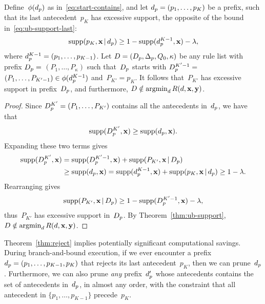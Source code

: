\begin{arxiv}
\begin{proposition}
\label{prop:ub-support}
Define~$\phi(d_p)$ as in~\eqref{eq:start-contains},
and let ${d_p = (p_1, \dots, p_{K})}$ be a prefix,
such that its last antecedent~$p_{K}$ has excessive support,
\ie the opposite of the bound in~\eqref{eq:ub-support-last}:
\begin{align}
\textnormal{supp}(p_K, \mathbf{x} \,|\, d_p) \ge 1 - \textnormal{supp}(d_p^{K-1}, \mathbf{x}) - {\lambda},
\end{align}
where ${d_p^{K-1} = (p_1, \dots, p_{K-1})}$.
%
Let ${{D} = (D_p, \Delta_p, Q_0, \kappa)}$
be any rule list with prefix
${D_p =}$ ${(P_1, \dots, P_{\kappa})}$
such that~$D_p$ starts with ${D_p^{K'-1} =}$
${(P_1, \dots, P_{K'-1}) \in \phi(d_p^{K-1})}$
and~${P_{K'} = p_{K}}$.
%
It follows that~$P_{K'}$ has excessive support in prefix~$D_p$,
and furthermore, ${{D} \notin \operatorname*{argmin}_{{d}} R({d}, \mathbf{x}, \mathbf{y})}$.
\end{proposition}

\begin{proof}
Since ${D_p^{K'} = (P_1, \dots, P_{K'})}$
contains all the antecedents in~$d_p$, we have that
\begin{align}
\textnormal{supp}(D_p^{K'}, \mathbf{x}) \ge \textnormal{supp}(d_p, \mathbf{x}).
\end{align}
Expanding these two terms gives
\begin{align}
\textnormal{supp}(D_p^{K'}, \mathbf{x})
&= \textnormal{supp}(D_p^{K'-1}, \mathbf{x}) + \textnormal{supp}(P_{K'}, \mathbf{x} \,|\, D_p) \nonumber \\
&\ge \textnormal{supp}(d_p, \mathbf{x})
= \textnormal{supp}(d_p^{K-1}, \mathbf{x}) + \textnormal{supp}(p_K, \mathbf{x} \,|\, d_p)
\ge 1 - {\lambda}.
\end{align}
Rearranging gives
\begin{align}
\textnormal{supp}(P_{K'}, \mathbf{x} \,|\, D_p)
\ge 1 - \textnormal{supp}(D_p^{K'-1}, \mathbf{x}) - {\lambda},
\end{align}
thus~$P_{K'}$ has excessive support in~$D_p$.
%
By Theorem~\ref{thm:ub-support},
${{D} \notin \operatorname*{argmin}_{{d}} R({d}, \mathbf{x}, \mathbf{y})}$.
\end{proof}

Theorem~\ref{thm:reject} implies potentially significant
computational savings.
%
During branch-and-bound execution, if we ever encounter a
prefix ${d_p = (p_1, \dots, p_{K-1}, p_K)}$ that rejects its
last antecedent~$p_K$, then we can prune~$d_p$.
%
Furthermore, we can also prune \emph{any} prefix~$d_p'$
whose antecedents contains the set of antecedents in~$d_p$,
in almost any order, with the constraint that all antecedent
in ${\{p_1, \dots, p_{K-1}\}}$ precede~$p_K$.

\end{arxiv}

